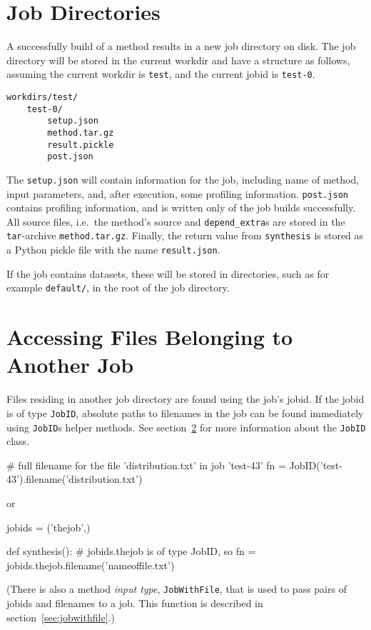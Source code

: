 \section{Job Directories}
\label{sec:job_directories}

A successfully build of a method results in a new job directory on
disk.  The job directory will be stored in the current workdir and
have a structure as follows, assuming the current workdir
is \texttt{test}, and the current jobid is \texttt{test-0}.
\begin{verbatim}
workdirs/test/
    test-0/
        setup.json
        method.tar.gz
        result.pickle
        post.json
\end{verbatim}
The \texttt{setup.json} will contain information for the job,
including name of method, input parameters, and, after execution, some
profiling information.  \texttt{post.json} contains profiling
information, and is written only of the job builds successfully.  All
source files, i.e.\ the method's source and \texttt{depend\_extra}s
are stored in the \texttt{tar}-archive \texttt{method.tar.gz}.
Finally, the return value from \texttt{synthesis} is stored as a
Python pickle file with the name \texttt{result.json}.

If the job contains datasets, these will be stored in directories,
such as for example \texttt{default/}, in the root of the job
directory.



\section{Accessing Files Belonging to Another Job}
Files residing in another job directory are found using the job's
jobid.  If the jobid is of type \texttt{JobID}, absolute paths to
filenames in the job can be found immediately using \texttt{JobID}s
helper methods.  See section~\ref{} for more information about the
\texttt{JobID} class.
\begin{python}
# full filename for the file 'distribution.txt' in job 'test-43'
fn = JobID('test-43').filename('distribution.txt')
\end{python}
or
\begin{python}
jobids = ('thejob',)

def synthesis():
    # jobids.thejob is of type JobID, so
    fn = jobids.thejob.filename('nameoffile.txt')
\end{python}

(There is also a method \textsl{input type}, \texttt{JobWithFile},
that is used to pass pairs of jobids and filenames to a job.  This
function is described in section~\ref{sec:jobwithfile}.)




